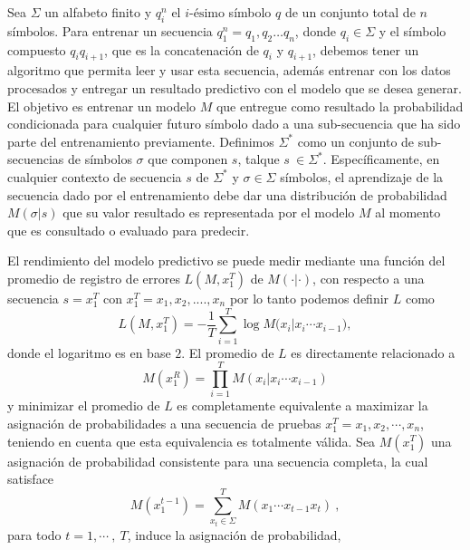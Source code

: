 
Sea $\Sigma$ un alfabeto finito y $q_{i}^{n}$ el $i\mbox{-ésimo}$ símbolo $q$ de un conjunto total de $n$ símbolos. Para entrenar un secuencia $q_{1}^{n}=q_{1},q_{2} \dots q_{n}$, donde $q_{i} \in \Sigma$ y el símbolo compuesto $q_{i}q_{i+1}$, que es la concatenación de $q_{i}$ y $q_{i+1}$, debemos tener un algoritmo que permita leer y usar esta secuencia, además entrenar con los datos procesados y entregar un resultado predictivo con el modelo que se desea generar. El objetivo es entrenar un modelo $M$ que entregue como resultado la probabilidad condicionada para cualquier futuro símbolo dado a una sub-secuencia que ha sido parte del entrenamiento previamente.
Definimos $\Sigma^{*}$ como un conjunto de sub-secuencias de símbolos $\sigma$ que componen $s$, talque $s \ \in \Sigma^{*} $. Específicamente, en cualquier contexto de secuencia $s$ de $\Sigma^{*}$  y  $\sigma \in \Sigma$ símbolos, el aprendizaje de la secuencia dado por el entrenamiento debe dar una distribución de probabilidad $M(\sigma | s )$ que su valor resultado es representada por el modelo $M$ al momento que es consultado o evaluado para predecir.

El rendimiento del modelo predictivo se puede medir mediante una función del promedio de registro de errores $L(M,x_{1}^{T})$ de $M (\cdot | \cdot )$, con respecto a una secuencia $s = x_{1}^{T}$ con $x_{1}^{T}= x_{1},x_{2},....,x_{n} $ %
  por lo tanto podemos definir $L$ como \begin{equation} L( M , x_{1}^{T} ) = 
- \dfrac{1}{T} 
\sum _{i=1}^{T} \log{ M(x_{i} | x_{i} \cdots x_{i-1}} ),\end{equation}
donde el logaritmo es en base $2$.  El promedio de $L$ es directamente relacionado a  \begin{equation}M(x_{1}^{R}) = \prod_{i=1}^{T} M(x_{i} | x_{i} \cdots x_{i-1} ) \end{equation} y minimizar el promedio de $L$ es completamente equivalente a maximizar la asignación de probabilidades a una secuencia de pruebas $x_{1}^{T}= x_{1},x_{2},\cdots,x_{n} $, teniendo en cuenta que esta equivalencia es totalmente válida. 
Sea $M(x_{1}^{T})$ una asignación de probabilidad consistente para una secuencia completa, la cual satisface \begin{equation}
M(x_{1}^{t-1}) = \sum_{\mbox{$x_t$} \in \Sigma}^{T} M(x_{1} \cdots x_{t-1}x_{t} ) \ , 
\end{equation}para todo $t=1,\cdots\ ,\ T$, induce la asignación de probabilidad,

